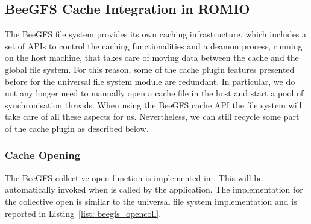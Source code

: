 \subsection{BeeGFS Cache Integration in ROMIO}
The BeeGFS file system provides its own caching infrastructure, which includes a set of APIs to control the caching functionalities and a deamon process, running on the host machine, that takes care of moving data between the cache and the global 
file system. For this reason, some of the cache plugin features presented before for the universal file system module are redundant. In particular, we do not any longer need to manually open a cache file in the host and start a pool of synchronisation 
threads. When using the BeeGFS cache API the file system will take care of all these aspects for us. Nevertheless, we can still recycle some part of the cache plugin as described below.

\subsubsection{Cache Opening}
The BeeGFS collective open function is implemented in . This will be automatically invoked when  is called by the application. The implementation for the collective open is similar to the 
universal file system implementation and is reported in Listing~\ref{list: beegfs_opencoll}.

